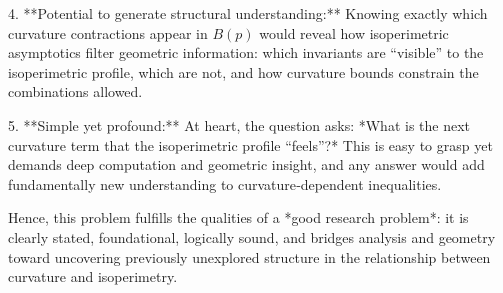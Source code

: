 4. **Potential to generate structural understanding:**  
   Knowing exactly which curvature contractions appear in \(B(p)\) would reveal how isoperimetric asymptotics filter geometric information: which invariants are “visible” to the isoperimetric profile, which are not, and how curvature bounds constrain the combinations allowed.

5. **Simple yet profound:**  
   At heart, the question asks: *What is the next curvature term that the isoperimetric profile “feels”?* This is easy to grasp yet demands deep computation and geometric insight, and any answer would add fundamentally new understanding to curvature‑dependent inequalities.  

Hence, this problem fulfills the qualities of a *good research problem*: it is clearly stated, foundational, logically sound, and bridges analysis and geometry toward uncovering previously unexplored structure in the relationship between curvature and isoperimetry.